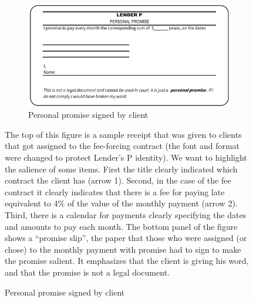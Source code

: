 \documentclass[oneside,11pt]{article}
\begin{document}
\begin{figure}[H]
\begin{center}
    \vspace{3ex}
    \begin{subfigure}{0.65\textwidth}
    \caption{Personal promise signed by client}
        \centering
        \includegraphics[width=\textwidth]{Figuras/Personal Promise2.png}
    \end{subfigure}
    \end{center}
    \scriptsize
        The top of this figure is a sample receipt that was given to clients that got assigned to the fee-forcing contract (the font and format were changed to protect Lender's P identity). We want to highlight the salience of some items. First the title clearly indicated which contract the client has (arrow 1). Second, in the case of the fee contract it clearly indicates that there is a fee for paying late equivalent to 4\% of the value of the monthly payment (arrow 2). Third, there is a calendar for payments clearly specifying the dates and amounts to pay each month. The bottom panel of the figure shows a ``promise slip'', the paper that those who were assigned (or chose) to the monthly payment with promise had to sign to make the promise salient. It emphasizes that the client is giving his word, and that the promise is not a legal document.
\end{figure}
\end{document}

